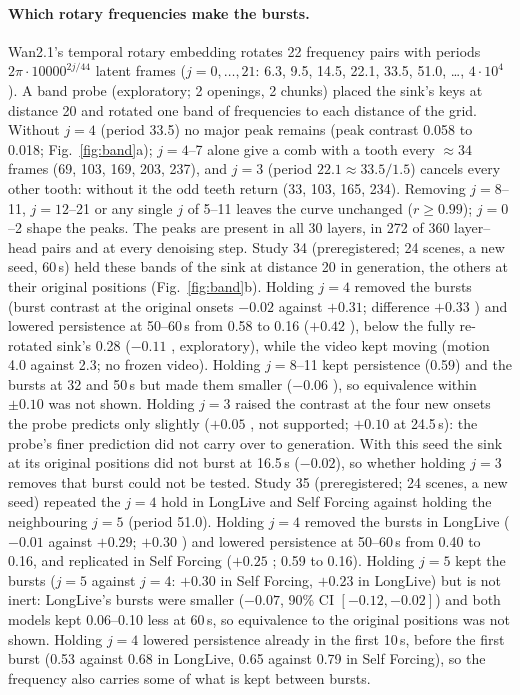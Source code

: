 \paragraph{Which rotary frequencies make the bursts.} Wan2.1's temporal rotary embedding rotates 22 frequency pairs
with periods $2\pi\cdot10000^{2j/44}$ latent frames ($j=0,\dots,21$: 6.3, 9.5, 14.5, 22.1, 33.5, 51.0, \dots,
$4\cdot10^4$). A band probe (exploratory; 2 openings, 2 chunks) placed the sink's keys at distance 20 and rotated one
band of frequencies to each distance of the grid. Without $j=4$ (period 33.5) no major peak remains (peak contrast 0.058
to 0.018; Fig.~\ref{fig:band}a); $j=4$--7 alone give a comb with a tooth every ${\approx}34$ frames (69, 103, 169, 203,
237), and $j=3$ (period $22.1\approx33.5/1.5$) cancels every other tooth: without it the odd teeth return (33, 103,
165, 234). Removing $j=8$--11, $j=12$--21 or any single $j$ of 5--11 leaves the curve unchanged ($r\ge0.99$); $j=0$--2
shape the peaks. The peaks are present in all 30 layers, in 272 of 360 layer--head pairs and at every denoising step.
Study 34 (preregistered; 24 scenes, a new seed, 60\,s) held these bands of the sink at distance 20 in generation, the
others at their original positions (Fig.~\ref{fig:band}b). Holding $j=4$ removed the bursts (burst contrast at the
original onsets $-0.02$ against $+0.31$; difference $+0.33$ ) and lowered persistence at 50--60\,s
from 0.58 to 0.16 ($+0.42$ ), below the fully re-rotated sink's 0.28 ($-0.11$ ,
exploratory), while the video kept moving (motion 4.0 against 2.3; no frozen video). Holding $j=8$--11 kept
persistence (0.59) and the bursts at 32 and 50\,s but made them smaller ($-0.06$ ), so equivalence
within $\pm0.10$ was not shown. Holding $j=3$ raised the contrast at the four new onsets the probe predicts only
slightly ($+0.05$ , not supported; $+0.10$ at 24.5\,s): the probe's finer prediction did not carry
over to generation. With this seed the sink at its original positions did not burst at 16.5\,s ($-0.02$), so whether
holding $j=3$ removes that burst could not be tested. Study 35 (preregistered; 24 scenes, a new seed) repeated the
$j=4$ hold in LongLive and Self Forcing against holding the neighbouring $j=5$ (period 51.0). Holding $j=4$ removed the
bursts in LongLive ($-0.01$ against $+0.29$; $+0.30$ ) and lowered persistence at 50--60\,s from 0.40
to 0.16, and replicated in Self Forcing ($+0.25$ ; 0.59 to 0.16). Holding $j=5$ kept the bursts
($j=5$ against $j=4$: $+0.30$  in Self Forcing, $+0.23$  in LongLive) but is not inert:
LongLive's bursts were smaller ($-0.07$, 90\% CI $[-0.12, -0.02]$) and both models kept 0.06--0.10 less at 60\,s, so
equivalence to the original positions was not shown. Holding $j=4$ lowered persistence already in the first 10\,s,
before the first burst (0.53 against 0.68 in LongLive, 0.65 against 0.79 in Self Forcing), so the frequency also carries
some of what is kept between bursts.

